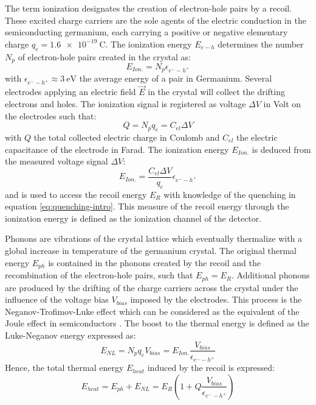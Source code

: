 The term ionization designates the creation of electron-hole pairs by a recoil. These excited charge carriers are the sole agents of the electric conduction in the semiconducting germanium, each carrying a positive or negative elementary charge $q_e = \SI{1.6e-19}{\coulomb}$.
The ionization energy $E_{e-h}$ determines the number $N_p$ of electron-hole pairs created in the crystal as:
\begin{equation}
E_{Ion.} = N_p \epsilon_{e^--h^+}
\end{equation}
with $\epsilon_{e^--h^+} \approx \SI{3}{\eV}$ the average energy of a pair in Germanium. 
Several electrodes applying an electric field $\vec{E}$ in the crystal will collect the drifting electrons and holes. The ionization signal is registered as voltage $\Delta V$ in Volt on the electrodes such that:
\begin{equation}
Q = N_p q_e = C_{el} \Delta V
\end{equation} 
with $Q$ the total collected electric charge in Coulomb and $C_{el}$ the electric capacitance of the electrode in Farad.
The ionization energy $E_{Ion.}$ is deduced from the measured voltage signal $\Delta V$:
\begin{equation}
E_{Ion.} = \frac{C_{el} \Delta V}{q_{e}} \epsilon_{e^--h^+}
\end{equation}
and is used to access the recoil energy $E_R$ with knowledge of the quenching in equation \ref{eq:quenching-intro}. This measure of the recoil energy through the ionization energy is defined as the ionization channel of the  detector.


Phonons are vibrations of the crystal lattice which eventually thermalize with a global increase in temperature of the germanium crystal. The original thermal energy $E_{ph}$ is contained in the phonons created by the recoil and the recombination of the electron-hole pairs, such that $E_{ph} = E_R$.
Additional phonons are produced by the drifting  of the charge carriers across the crystal under the influence of the voltage bias $V_{bias}$ imposed by the electrodes. This process is the Neganov-Trofimov-Luke effect which can be considered as the equivalent of the Joule effect in semiconductors \cite{Luke,Neganov:1985khw}.
The boost to the thermal energy is defined as the Luke-Neganov energy expressed as:
\begin{equation}
E_{NL} = N_p q_e V_{bias} = E_{Ion.} \frac{V_{bias}}{\epsilon_{e^--h^+}}
\end{equation}
Hence, the total thermal energy $E_{heat}$ induced by the recoil is expressed:
\begin{equation}
E_{heat} = E_{ph} + E_{NL} = E_R \left( 1 + Q \frac{V_{bias}}{\epsilon_{e^--h^+}} \right)
\end{equation}

